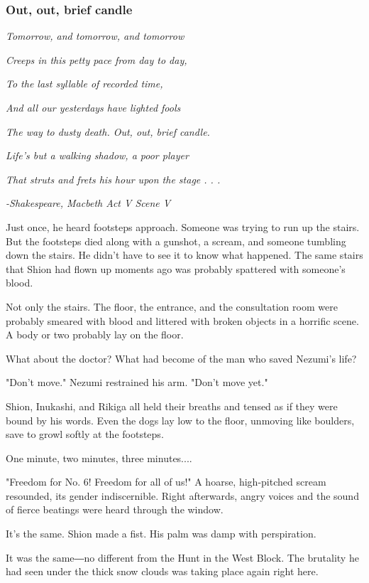 \subsubsection{Out, out, brief candle}

\emph{Tomorrow, and tomorrow, and tomorrow}

\emph{Creeps in this petty pace from day to day,}

\emph{To the last syllable of recorded time,}

\emph{And all our yesterdays have lighted fools}

\emph{The way to dusty death. Out, out, brief candle.}

\emph{Life's but a walking shadow, a poor player}

\emph{That struts and frets his hour upon the stage . . .}

\emph{-Shakespeare, Macbeth Act V Scene V}

Just once, he heard footsteps approach. Someone was trying to run up the
stairs. But the footsteps died along with a gunshot, a scream, and
someone tumbling down the stairs. He didn't have to see it to know what
happened. The same stairs that Shion had flown up moments ago was
probably spattered with someone's blood.

Not only the stairs. The floor, the entrance, and the consultation room
were probably smeared with blood and littered with broken objects in a
horrific scene. A body or two probably lay on the floor.

What about the doctor? What had become of the man who saved Nezumi's
life?

"Don't move." Nezumi restrained his arm. "Don't move yet."

Shion, Inukashi, and Rikiga all held their breaths and tensed as if they
were bound by his words. Even the dogs lay low to the floor, unmoving
like boulders, save to growl softly at the footsteps.

One minute, two minutes, three minutes....

"Freedom for No. 6! Freedom for all of us!" A hoarse, high-pitched
scream resounded, its gender indiscernible. Right afterwards, angry
voices and the sound of fierce beatings were heard through the window.

It's the same. Shion made a fist. His palm was damp with perspiration.

It was the same―no different from the Hunt in the West Block. The
brutality he had seen under the thick snow clouds was taking place again
right here.

